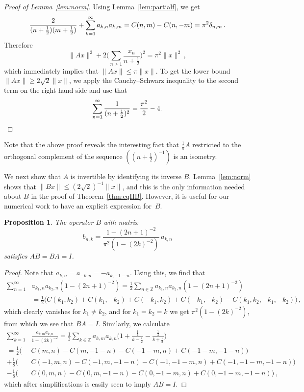 \documentclass[12pt]{amsart}
\theoremstyle{plain}
\newtheorem{proposition}{Proposition}
\newcommand{\Z}{\mathbb{Z}}
\begin{document}
\begin{proof}[Proof of Lemma~\ref{lem:norm}]
	Using Lemma~\ref{lem:partialf},
	we get
	\begin{equation*}
	\frac{2}{(n+\frac12)(m+\frac12)}+\sum_{k=1}^{\infty}a_{k,n}a_{k,m}\\
	=C(n,m)-C(n,-m) = \pi^2\delta_{n,m}\,.
	\end{equation*}
	Therefore
	\begin{equation*}
	\|Ax\|^2 +2\Big(\sum_{n\ge1}\frac{x_n}{n+\frac12}\Big)^2 =  \pi^2\|x\|^2\,,
	\end{equation*}
	which immediately implies that $\|Ax\|\le \pi\|x\|$. To get the lower bound $\|Ax\|\ge 2\sqrt{2}\|x\|$, we apply the Cauchy--Schwarz inequality to the second term on the right-hand side and use that
	\[ \sum_{n=1}^{\infty} \frac{1}{(n+\frac12)^2}=\frac{\pi^2}{2}-4. \qedhere \]
\end{proof}
Note that the above proof reveals the interesting fact that $\frac1\pi A$ restricted to the orthogonal complement of the sequence $((n+\frac12)^{-1})$ is an isometry. 

We next show that $A$ is invertible by identifying its inverse $B$. Lemma~\ref{lem:norm} shows that $\| Bx\|\le (2\sqrt{2})^{-1} \|x\|$, and this is the only information needed about $B$ in the proof of Theorem~\ref{thm:eqHB}. However, it is useful for our numerical work %
to have an explicit expression for~$B$. 
\begin{proposition} %
The operator $B$ with matrix
	\[b_{n,k} =  \frac{1-(2n+1)^{-2}}{\pi^2(1-(2k)^{-2})}\, a_{k,n}\]
satisfies $AB=BA=I$.
\end{proposition}
\begin{proof}
	Note that $a_{k,n}=a_{-k,n}=-a_{k,-1-n}$. Using this, we find that
	\begin{align*}
	\sum_{n=1}^{\infty}&a_{k_1,n}a_{k_2,n}(1-(2n+1)^{-2}) =
	\frac12\sum_{n\in\Z}a_{k_1,n}a_{k_2,n}(1-(2n+1)^{-2})\\
	&=\frac12\Big(C(k_1,k_2)+C(k_1,-k_2)+C(-k_1,k_2)+C(-k_1,-k_2)-C(k_1,k_2,-k_1,-k_2)\Big)\,,
	\end{align*}
	which clearly vanishes for $k_1\ne k_2$, and for $k_1=k_2=k$ we get
	$\pi^2(1-(2k)^{-2})$, from which we see that $BA=I$. Similarly, we calculate 
	\begin{align*}
	\sum_{k=1}^{\infty}&\frac{a_{k,m}a_{k,n}}{1-(2k)^{-2}} =
	\frac12\sum_{k\in\Z}a_{k,m}a_{k,n}\Big(1+\frac{\frac14}{k-\frac12}-\frac{\frac14}{k+\frac12}\Big)\\
	=\frac12\Big(&C(m,n)-C(m,-1{-}n)-C(-1{-}m,n)+C(-1{-}m,-1{-}n)\Big)\\
	+\frac18\Big(&C(-1,m,n)-C(-1,m,-1{-}n)-C(-1,-1{-}m,n)+C(-1,-1{-}m,-1{-}n)\Big)\\
	-\frac18\Big(&C(0,m,n)-C(0,m,-1{-}n)-C(0,-1{-}m,n)+C(0,-1{-}m,-1{-}n)\Big)\,,
	\end{align*}
	which after simplifications is easily seen to imply $AB=I$.
\end{proof}
\end{document}
